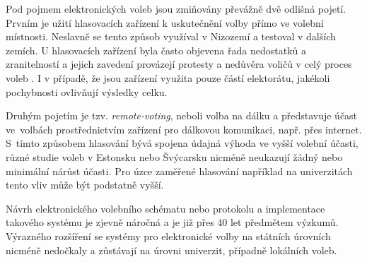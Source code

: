 Pod pojmem elektronických voleb jsou zmiňovány převážně dvě odlišná pojetí. Prvním je užití hlasovacích zařízení k uskutečnění volby přímo ve volební místnosti. Neslavně se tento způsob využíval v Nizozemí \cite{GoldsmithCaseSR} a testoval v dalších zemích. U hlasovacích zařízení byla často objevena řada nedostatků a zranitelností a jejich zavedení provázejí protesty a nedůvěra voličů v celý proces voleb \cite{Valasek2020}. I v případě, že jsou zařízení využita pouze částí elektorátu, jakékoli pochybnosti ovlivňují výsledky celku.

Druhým pojetím je tzv. \textit{remote-voting}, neboli volba na dálku a představuje účast ve~volbách prostřednictvím zařízení  pro dálkovou komunikaci, např. přes internet. S~tímto způsobem hlasování bývá spojena údajná výhoda ve vyšší volební účasti, různé studie voleb v Estonsku \cite{estoniaTurnout} nebo Švýcarsku \cite{swissTurnout} nicméně neukazují žádný nebo minimální nárůst účasti. Pro úzce zaměřené hlasování například na univerzitách tento vliv může být podstatně vyšší.

Návrh elektronického volebního schématu nebo protokolu a implementace takového systému je zjevně náročná a je již přes 40 let předmětem výzkumů. Výrazného rozšíření se systémy pro elektronické volby na státních úrovních nicméně nedočkaly a zůstávají na úrovni univerzit, případně lokálních voleb.

